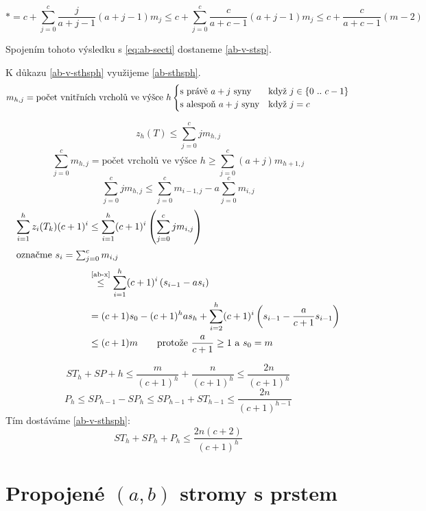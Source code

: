 \begin{equation}
  *
  =    c + \sum_{j=0}^c \frac{j}{a+j-1}(a+j-1) m_j 
  \leq c + \sum_{j=0}^c \frac{c}{a+c-1}(a+j-1) m_j 
  \leq c + \frac{c}{a+c-1} (m-2)
\end{equation}

Spojením tohoto výsledku s \ref{eq:ab-secti} dostaneme \ref{ab-v-stsp}.

K důkazu \ref{ab-v-sthsph} využijeme \ref{ab-sthsph}.
\begin{equation}
  m_{h,j} = \text{počet vnitřních vrcholů ve výšce $h$}
  \begin{cases}
    \text{s právě $a+j$ syny}   & \text{když}\ j \in\{{0}\ ..\ {c-1}\}\\
    \text{s alespoň $a+j$ syny} & \text{když}\ j = c
  \end{cases}
\end{equation}

\begin{equation}
  z_h(T) \leq \sum_{j=0}^c j m_{h,j}
\end{equation}
\begin{equation}
  \sum_{j=0}^c m_{h,j}
   = \text{počet vrcholů ve výšce $h$} 
  \geq \sum_{j=0}^c (a+j) m_{h+1,j}
\end{equation}
\begin{equation}
\label{ab-x}
  \sum_{j=0}^c j m_{h,j}
  \leq \sum_{j=0}^c m_{i-1,j} - a \sum_{j=0}^c m_{i,j} 
\end{equation}
\begin{align}
   \sum_{i=1}^h z_i(T_k)(c+1)^i
 & \leq \sum_{i=1}^h (c+1)^i \left( \sum_{j=0}^c j m_{i,j} \right) \\
\intertext{označme $s_i = \sum_{j=0}^c m_{i,j}$}
 & \stackrel{\text{\ref{ab-x}}}{\leq} 
        \sum_{i=1}^h (c+1)^i \left( s_{i-1} - a s_i \right) \\
 & = (c+1)s_0 - (c+1)^h a s_h + 
        \sum_{i=2}^h (c+1)^i \left( s_{i-1} - \frac{a}{c+1} s_{i-1} \right) \\
 & \leq (c+1) m \qquad\text{protože $\frac{a}{c+1} \geq 1$ a $s_0 = m$}
\end{align}

\[
ST_h + SP+h \leq \frac{m}{(c+1)^h} + \frac{n}{(c+1)^h} \leq \frac{2n}{(c+1)^h}
\]
\[
P_h \leq SP_{h-1} - SP_h \leq SP_{h-1} + ST_{h-1} \leq \frac{2n}{(c+1)^{h-1}}
\]
Tím dostáváme \ref{ab-v-sthsph}:
\[
ST_h + SP_h + P_h \leq \frac{2 n (c+2)}{(c+1)^h}
\]


\section{Propojené $(a,b)$ stromy s prstem}

